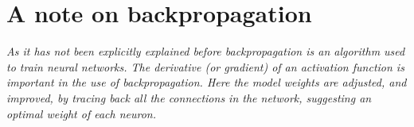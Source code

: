 \section{\textbf{A note on backpropagation}}
\emph{As it has not been explicitly explained before backpropagation is an algorithm used to train neural networks. The derivative (or gradient) of an activation function is important in the use of backpropagation. Here the model weights are adjusted, and improved, by tracing back all the connections in the network, suggesting an optimal weight of each neuron.}

